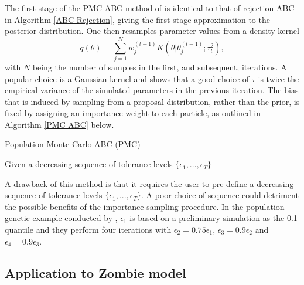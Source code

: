 \documentclass[]{article}
\begin{document}
The first stage of the PMC ABC method of \cite{RN21} is identical to that of rejection ABC in Algorithm \ref{ABC Rejection}, giving the first stage approximation to the posterior distribution. One then resamples parameter values from a density kernel 
$$ q(\theta) = \sum_{j=1}^{N} w_j^{(t-1)} K(\theta| \theta_{j}^{(t-1)};\tau_t^2),$$ 
with $N$ being the number of samples in the first, and subsequent, iterations. A popular choice is a Gaussian kernel and \cite{RN21} shows that a good choice of $\tau$ is twice the empirical variance of the simulated parameters in the previous iteration. The bias that is induced by sampling from a proposal distribution, rather than the prior, is fixed by assigning an importance weight to each particle, as outlined in Algorithm \ref{PMC ABC} below. 


\begin{algorithm}[H]
	\label{PMC ABC}
	\caption{Population Monte Carlo ABC (PMC)}
	Given a decreasing sequence of tolerance levels $\{\epsilon_1, ..., \epsilon_T\}$\;
\end{algorithm}	

A drawback of this method is that it requires the user to pre-define a decreasing sequence of tolerance levels $\{\epsilon_1, ..., \epsilon_T\}$. A poor choice of sequence could detriment the possible benefits of the importance sampling procedure. In the population genetic example conducted by \cite{RN21}, $\epsilon_1$ is based on a preliminary simulation as the 0.1 quantile and they perform four iterations with $\epsilon_2 = 0.75\epsilon_1$, $\epsilon_3 = 0.9\epsilon_2$ and $\epsilon_4 = 0.9\epsilon_3$.

\subsection{Application to Zombie model}
\end{document}
